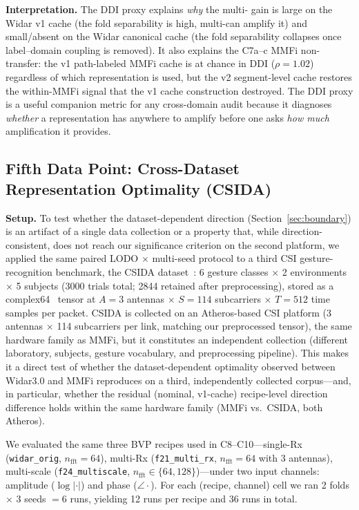 \documentclass[11pt]{article}
\theoremstyle{definition}
\newcommand{\CSI}{\text{CSI}}
\newcommand{\Rx}{\text{Rx}}
\begin{document}
\textbf{Interpretation.} The DDI proxy explains \emph{why} the multi-\Rx{} gain is large on the Widar v1 cache (the fold separability is high, multi-\Rx can amplify it) and small/absent on the Widar canonical cache (the fold separability collapses once label--domain coupling is removed). It also explains the C7a--c MMFi non-transfer: the v1 path-labeled MMFi cache is at chance in DDI ($\rho = 1.02$) regardless of which representation is used, but the v2 segment-level cache restores the within-MMFi signal that the v1 cache construction destroyed. The DDI proxy is a useful companion metric for any cross-domain audit because it diagnoses \emph{whether} a representation has anywhere to amplify before one asks \emph{how much} amplification it provides.

\subsection{Fifth Data Point: Cross-Dataset Representation Optimality (CSIDA)}
\label{sec:fifth-data-point}

\textbf{Setup.} To test whether the dataset-dependent direction (Section~\ref{sec:boundary}) is an artifact of a single data collection or a property that, while direction-consistent, does not reach our significance criterion on the second platform, we applied the same paired LODO $\times$ multi-seed protocol to a third CSI gesture-recognition benchmark, the CSIDA dataset~\cite{csida2022}: 6 gesture classes $\times$ 2 environments $\times$ 5 subjects (3000 trials total; 2844 retained after preprocessing), stored as a complex64 \CSI\ tensor at $A{=}3$ antennas $\times$ $S{=}114$ subcarriers $\times$ $T{=}512$ time samples per packet. CSIDA is collected on an Atheros-based CSI platform (3 antennas $\times$ 114 subcarriers per link, matching our preprocessed tensor), the same hardware family as MMFi, but it constitutes an independent collection (different laboratory, subjects, gesture vocabulary, and preprocessing pipeline). This makes it a direct test of whether the dataset-dependent optimality observed between Widar3.0 and MMFi reproduces on a third, independently collected corpus---and, in particular, whether the residual (nominal, v1-cache) recipe-level direction difference holds within the same hardware family (MMFi vs.\ CSIDA, both Atheros).

We evaluated the same three BVP recipes used in C8--C10---single-Rx (\texttt{widar\_orig}, $n_\text{fft}{=}64$), multi-Rx (\texttt{f21\_multi\_rx}, $n_\text{fft}{=}64$ with 3 antennas), multi-scale (\texttt{f24\_multiscale}, $n_\text{fft} \in \{64, 128\}$)---under two input channels: amplitude ($\log|\cdot|$) and phase ($\angle \cdot$). For each (recipe, channel) cell we ran 2 folds $\times$ 3 seeds $= 6$ runs, yielding 12 runs per recipe and 36 runs in total.
\end{document}
